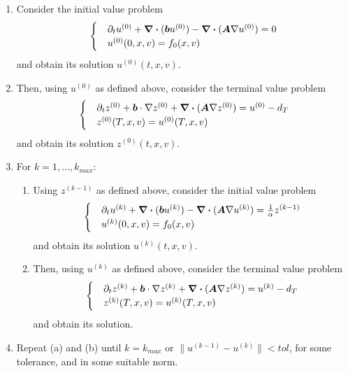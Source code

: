 \documentclass{article}  %
\begin{document}
\begin{enumerate}
    \item Consider the initial value problem
    \begin{align} 
        \begin{cases}
        &\partial_t u^{(0)} + \div{(\boldsymbol{b}u^{(0)})} - \div{(\boldsymbol{A} \nabla u^{(0)})} = 0\\
        &u^{(0)}(0,x,v) = f_0(x,v)
        \end{cases}
    \end{align}
    and obtain its solution $u^{(0)}(t,x,v)$.
    \item Then, using $u^{(0)}$ as defined above, consider the terminal value problem 
    \begin{align} 
        \begin{cases} 
            &\partial_t z^{(0)} + \boldsymbol{b} \cdot \nabla z^{(0)} + \div{(\boldsymbol{A} \nabla z^{(0)})} = u^{(0)} - d_T\\
            &z^{(0)}(T,x,v) = u^{(0)}(T,x,v)
        \end{cases}
    \end{align}
    and obtain its solution $z^{(0)}(t,x,v)$.
    \item For $k=1,\dots,k_{max}$:
    \begin{enumerate}
        \item Using $z^{(k-1)}$ as defined above, consider the initial value problem 
        \begin{align}
            \label{eq:primal-iteration} 
            \begin{cases}
                &\partial_t u^{(k)} + \div{(\boldsymbol{b}u^{(k)})} - \div{(\boldsymbol{A} \nabla u^{(k)})} = \frac{1}{\alpha} z^{(k-1)}\\
                &u^{(k)}(0,x,v) = f_0(x,v)
            \end{cases}
        \end{align}
        and obtain its solution $u^{(k)}(t,x,v)$.
        \item Then, using $u^{(k)}$ as defined above, consider the terminal value problem 
        \begin{align}
            \label{eq:dual-iteration}
            \begin{cases}
                &\partial_t z^{(k)} + \boldsymbol{b} \cdot \nabla z^{(k)} + \div{(\boldsymbol{A} \nabla z^{(k)})} = u^{(k)} - d_T\\
                &z^{(k)}(T,x,v) = u^{(k)}(T,x,v)
            \end{cases} 
        \end{align} 
        and obtain its solution.
    \end{enumerate}
    \item Repeat (a) and (b) until $k=k_{max}$ or $\lVert u^{(k-1)} - u^{(k)} \rVert < tol$, for some tolerance, and in some suitable norm.
\end{enumerate}
\end{document}
